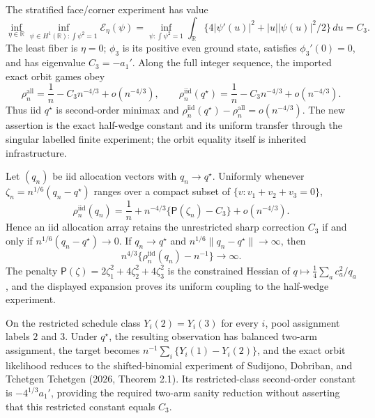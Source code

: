 The stratified face/corner experiment has value
\[
\inf_{\eta\in\mathbb R}
\inf_{\psi\in H^1(\mathbb R):\int\psi^2=1}\mathcal E_\eta(\psi)
=\inf_{\psi:\int\psi^2=1}
\int_{\mathbb R}\{4|\psi'(u)|^2+|u||\psi(u)|^2/2\}\,du=C_3.
\]
The least fiber is \(\eta=0\); \(\phi_3\) is its positive even ground state, satisfies \(\phi_3'(0)=0\), and has eigenvalue \(C_3=-a_1'\).  Along the full integer sequence, the imported exact orbit games obey
\[
\rho_n^{\mathrm{all}}=\frac1n-C_3n^{-4/3}+o(n^{-4/3}),
\qquad
\rho_n^{\mathrm{iid}}(q^\star)=\frac1n-C_3n^{-4/3}+o(n^{-4/3}).
\]
Thus iid \(q^\star\) is second-order minimax and
\(\rho_n^{\mathrm{iid}}(q^\star)-\rho_n^{\mathrm{all}}=o(n^{-4/3})\).
The new assertion is the exact half-wedge constant and its uniform transfer through the singular labelled finite experiment; the orbit equality itself is inherited infrastructure.

Let \((q_n)\) be iid allocation vectors with \(q_n\to q^\star\).  Uniformly whenever \(\zeta_n=n^{1/6}(q_n-q^\star)\) ranges over a compact subset of \(\{v:v_1+v_2+v_3=0\}\),
\[
\rho_n^{\mathrm{iid}}(q_n)
=\frac1n+n^{-4/3}\{\mathsf P(\zeta_n)-C_3\}+o(n^{-4/3}).
\]
Hence an iid allocation array retains the unrestricted sharp correction \(C_3\) if and only if \(n^{1/6}(q_n-q^\star)\to0\).  If \(q_n\to q^\star\) and \(n^{1/6}\|q_n-q^\star\|\to\infty\), then
\[
n^{4/3}\{\rho_n^{\mathrm{iid}}(q_n)-n^{-1}\}\to\infty.
\]
The penalty \(\mathsf P(\zeta)=2\zeta_1^2+4\zeta_2^2+4\zeta_3^2\) is the constrained Hessian of \(q\mapsto\frac14\sum_ac_a^2/q_a\), and the displayed expansion proves its uniform coupling to the half-wedge experiment.

On the restricted schedule class \(Y_i(2)=Y_i(3)\) for every \(i\), pool assignment labels \(2\) and \(3\).  Under \(q^\star\), the resulting observation has balanced two-arm assignment, the target becomes \(n^{-1}\sum_i\{Y_i(1)-Y_i(2)\}\), and the exact orbit likelihood reduces to the shifted-binomial experiment of Sudijono, Dobriban, and Tchetgen Tchetgen (2026, Theorem 2.1).  Its restricted-class second-order constant is \(-4^{1/3}a_1'\), providing the required two-arm sanity reduction without asserting that this restricted constant equals \(C_3\).
